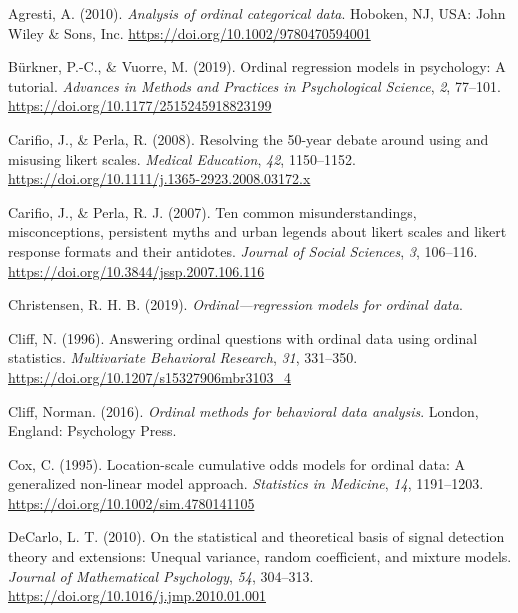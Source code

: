 \documentclass[
  man,floatsintext]{apa6}
\newlength{\cslhangindent}
\newenvironment{CSLReferences}[2] %
 {\begin{list}{}{%
  \setlength{\itemindent}{0pt}
  \setlength{\leftmargin}{0pt}
  \setlength{\parsep}{0pt}
  \ifodd #1
   \setlength{\leftmargin}{\cslhangindent}
   \setlength{\itemindent}{-1\cslhangindent}
  \fi
  \setlength{\itemsep}{#2\baselineskip}}}
 {\end{list}}
\begin{document}
\label{refs}
\begin{CSLReferences}{1}{0}
Agresti, A. (2010). \emph{Analysis of ordinal categorical data}. Hoboken, NJ, USA: John Wiley \& Sons, Inc. \url{https://doi.org/10.1002/9780470594001}

Bürkner, P.-C., \& Vuorre, M. (2019). Ordinal regression models in psychology: A tutorial. \emph{Advances in Methods and Practices in Psychological Science}, \emph{2}, 77--101. \url{https://doi.org/10.1177/2515245918823199}

Carifio, J., \& Perla, R. (2008). Resolving the 50-year debate around using and misusing likert scales. \emph{Medical Education}, \emph{42}, 1150--1152. \url{https://doi.org/10.1111/j.1365-2923.2008.03172.x}

Carifio, J., \& Perla, R. J. (2007). Ten common misunderstandings, misconceptions, persistent myths and urban legends about likert scales and likert response formats and their antidotes. \emph{Journal of Social Sciences}, \emph{3}, 106--116. \url{https://doi.org/10.3844/jssp.2007.106.116}

Christensen, R. H. B. (2019). \emph{Ordinal---regression models for ordinal data}.

Cliff, N. (1996). Answering ordinal questions with ordinal data using ordinal statistics. \emph{Multivariate Behavioral Research}, \emph{31}, 331--350. \url{https://doi.org/10.1207/s15327906mbr3103_4}

Cliff, Norman. (2016). \emph{Ordinal methods for behavioral data analysis}. London, England: Psychology Press.

Cox, C. (1995). Location-scale cumulative odds models for ordinal data: A generalized non-linear model approach. \emph{Statistics in Medicine}, \emph{14}, 1191--1203. \url{https://doi.org/10.1002/sim.4780141105}

DeCarlo, L. T. (2010). On the statistical and theoretical basis of signal detection theory and extensions: Unequal variance, random coefficient, and mixture models. \emph{Journal of Mathematical Psychology}, \emph{54}, 304--313. \url{https://doi.org/10.1016/j.jmp.2010.01.001}


\end{CSLReferences}
\end{document}

